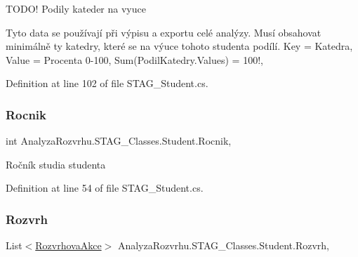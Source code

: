 T\+O\+D\+O! Podily kateder na vyuce 

Tyto data se používají při výpisu a exportu celé analýzy. Musí obsahovat minimálně ty katedry, které se na výuce tohoto studenta podílí. Key = Katedra, Value = Procenta 0-\/100, Sum(Podil\+Katedry.\+Values) = 100!, 

Definition at line 102 of file S\+T\+A\+G\+\_\+\+Student.\+cs.

\mbox{\label{class_analyza_rozvrhu_1_1_s_t_a_g___classes_1_1_student_aceb456b2f0875cada2b44f5314e320cd}} 
\subsubsection{\texorpdfstring{Rocnik}{Rocnik}}
{\footnotesize\ttfamily int Analyza\+Rozvrhu.\+S\+T\+A\+G\+\_\+\+Classes.\+Student.\+Rocnik\hspace{0.3cm}{\ttfamily [get]}, {\ttfamily [set]}}



Ročník studia studenta 



Definition at line 54 of file S\+T\+A\+G\+\_\+\+Student.\+cs.

\mbox{\label{class_analyza_rozvrhu_1_1_s_t_a_g___classes_1_1_student_a1a798f83334db8e22341cbf2bb638170}} 
\subsubsection{\texorpdfstring{Rozvrh}{Rozvrh}}
{\footnotesize\ttfamily List$<$\hyperlink{class_analyza_rozvrhu_1_1_s_t_a_g___classes_1_1_rozvrhova_akce}{Rozvrhova\+Akce}$>$ Analyza\+Rozvrhu.\+S\+T\+A\+G\+\_\+\+Classes.\+Student.\+Rozvrh\hspace{0.3cm}{\ttfamily [get]}, {\ttfamily [set]}}



